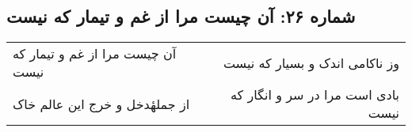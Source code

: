 \begin{center}
\section*{شماره ۲۶: آن چیست مرا از غم و تیمار که نیست}
\label{sec:026}
\begin{longtable}{l p{0.5cm} r}
آن چیست مرا از غم و تیمار که نیست
&&
وز ناکامی اندک و بسیار که نیست
\\
از جملهٔدخل و خرج این عالم خاک
&&
بادی است مرا در سر و انگار که نیست
\\
\end{longtable}
\end{center}
